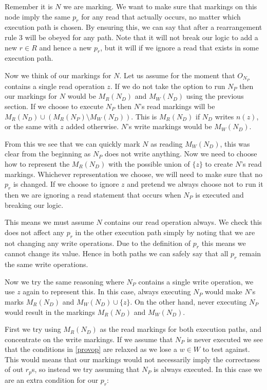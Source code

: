 \documentclass[twoside,a4paper]{report}
\begin{document}
Remember it is $N$ we are marking. We want to make sure that markings on this node imply the same $p_r$ for any read that actually occurs, no matter
which execution path is chosen. By ensuring this, we can say that after a rearrangement rule 3 will be obeyed for any path. Note that it will not
break our logic to add a new $r \in R$ and hence a new $p_r$, but it will if we ignore a read that exists in some execution path.

Now we think of our markings for $N$. Let us assume for the moment that $O_{N_P}$ contains a single read operation $z$. If we do not take
the option to run $N_P$ then our markings for $N$ would be $M_R(N_D)$ and $M_W(N_D)$ using the previous section. If we choose to execute $N_P$ then $N$'s
read markings will be $M_R(N_D) \cup (M_R(N_P) \setminus M_W(N_D))$. This is $M_R(N_D)$ if $N_D$ writes $n(z)$, or the same with $z$ added otherwise.
$N$'s write markings would be $M_W(N_D)$.

From this we see that we can quickly mark $N$ as reading $M_W(N_D)$, this was clear from the beginning as $N_P$ does not write anything. Now we need to choose
how to represent the $M_R(N_D)$ with the possible union of $\{z\}$ to create $N$'s read markings. Whichever representation we choose, we will need to make sure
that no $p_r$ is changed. If we choose to ignore $z$ and pretend we always choose not to run it then we are ignoring a read statement that occurs when $N_P$ is
executed and breaking our logic.

This means we must assume $N$ contains our read operation always. We check this does not affect any $p_r$ in the other execution path simply by noting that we
are not changing any write operations. Due to the definition of $p_r$ this means we cannot change its value. Hence in both paths we can safely say that all
$p_r$ remain the same write operations.

Now we try the same reasoning where $N_P$ contains a single write operation, we use $z$ again to represent this. In this case, always executing $N_P$ would
make $N$'s marks $M_R(N_D)$ and $M_W(N_D) \cup \{ z \}$. On the other hand, never executing $N_P$ would result in the markings $M_R(N_D)$ and $M_W(N_D)$.

First we try using $M_R(N_D)$ as the read markings for both execution paths, and concentrate on the write markings. If we assume that $N_P$ is never executed
we see that the conditions in \eqref{provop} are relaxed as we lose a $w \in W$ to test against. This would means that our markings would not necessarily imply
the correctness of out $r_p$s, so instead we try assuming that $N_P$ is always executed. In this case we are an extra condition for our $p_r$:
\end{document}
